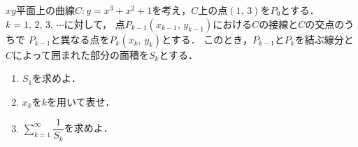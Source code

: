 \documentclass[../../main.tex]{subfiles}
\begin{document}
$xy$平面上の曲線$C:y=x^3+x^2+1$を考え，$C$上の点$(1, \, 3)$を$P_0$とする．
$k=1, \, 2, \, 3, \, \cdots$に対して，
点$P_{k-1}(x_{k-1}, \, y_{k-1})$における$C$の接線と$C$の交点のうちで
$P_{k-1}$と異なる点を$P_k(x_k, \, y_k)$とする．
このとき，$P_{k-1}$と$P_k$を結ぶ線分と$C$によって囲まれた部分の面積を$S_k$とする．
\begin{enumerate}
  \item $S_1$を求めよ．
  \item $x_k$を$k$を用いて表せ．
  \item $\displaystyle\sum_{k=1}^\infty\dfrac{1}{S_k}$を求めよ．
\end{enumerate}
\end{document}
